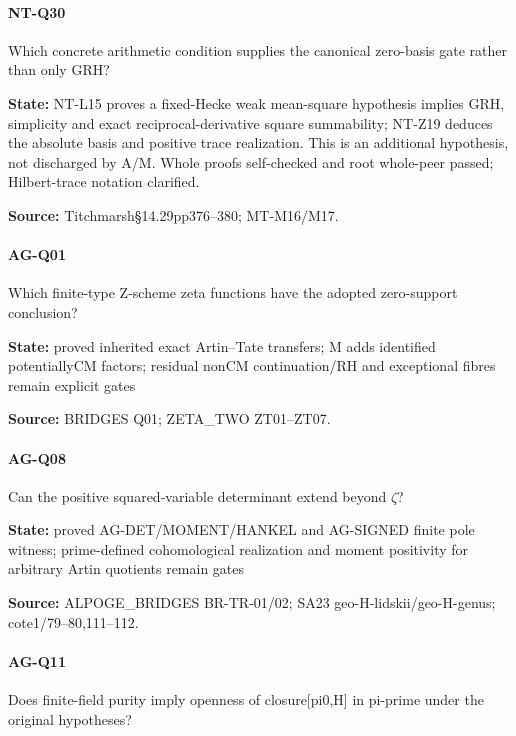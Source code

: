 \documentclass[11pt,a4paper]{article}
\begin{document}
\paragraph{NT-Q30} Which concrete arithmetic condition supplies the canonical zero-basis gate rather than only GRH?

\textbf{State:} NT-L15 proves a fixed-Hecke weak mean-square hypothesis implies GRH, simplicity and exact reciprocal-derivative square summability; NT-Z19 deduces the absolute basis and positive trace realization.\allowbreak{} This is an additional hypothesis, not discharged by A/\allowbreak{}M.\allowbreak{} Whole proofs self-checked and root whole-peer passed; Hilbert-trace notation clarified.\allowbreak{}

\textbf{Source:} Titchmarsh§14.\allowbreak{}29pp376–\allowbreak{}380; MT-M16/\allowbreak{}M17.

\paragraph{AG-Q01} Which finite-type Z-scheme zeta functions have the adopted zero-support conclusion?

\textbf{State:} proved inherited exact Artin–\allowbreak{}Tate transfers; M adds identified potentiallyCM factors; residual nonCM continuation/\allowbreak{}RH and exceptional fibres remain explicit gates

\textbf{Source:} BRIDGES Q01; ZETA\_\allowbreak{}TWO ZT01–\allowbreak{}ZT07.

\paragraph{AG-Q08} Can the positive squared-variable determinant extend beyond \ensuremath{\zeta}?

\textbf{State:} proved AG-DET/\allowbreak{}MOMENT/\allowbreak{}HANKEL and AG-SIGNED finite pole witness; prime-defined cohomological realization and moment positivity for arbitrary Artin quotients remain gates

\textbf{Source:} ALPOGE\_\allowbreak{}BRIDGES BR-TR-01/\allowbreak{}02; SA23 geo-H-lidskii/\allowbreak{}geo-H-genus; cote1/\allowbreak{}79–\allowbreak{}80,111–\allowbreak{}112.

\paragraph{AG-Q11} Does finite-field purity imply openness of closure[pi0,H] in pi-prime under the original hypotheses?
\end{document}
